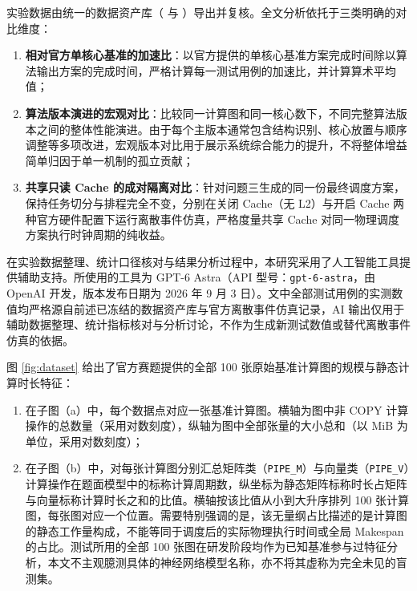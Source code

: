 \documentclass[anonymous,withtoc]{gmcm2026}
\providecommand{\tightlist}{\setlength{\itemsep}{0pt}\setlength{\parskip}{0pt}}
\begin{document}
实验数据由统一的数据资产库（\texttt{} 与 \texttt{}）导出并复核。全文分析依托于三类明确的对比维度：

\begin{enumerate}
\def\labelenumi{\arabic{enumi}.}
\tightlist
\item
  \textbf{相对官方单核心基准的加速比}：以官方提供的单核心基准方案完成时间除以算法输出方案的完成时间，严格计算每一测试用例的加速比，并计算算术平均值；
\item
  \textbf{算法版本演进的宏观对比}：比较同一计算图和同一核心数下，不同完整算法版本之间的整体性能演进。由于每个主版本通常包含结构识别、核心放置与顺序调整等多项改进，宏观版本对比用于展示系统综合能力的提升，不将整体增益简单归因于单一机制的孤立贡献；
\item
  \textbf{共享只读 Cache 的成对隔离对比}：针对问题三生成的同一份最终调度方案，保持任务切分与排程完全不变，分别在关闭 Cache（无 L2）与开启 Cache 两种官方硬件配置下运行离散事件仿真，严格度量共享 Cache 对同一物理调度方案执行时钟周期的纯收益。
\end{enumerate}

在实验数据整理、统计口径核对与结果分析过程中，本研究采用了人工智能工具提供辅助支持。所使用的工具为 GPT-6 Astra（API 型号：\texttt{gpt-6-astra}，由 OpenAI 开发，版本发布日期为 2026 年 9 月 3 日）。文中全部测试用例的实测数值均严格源自前述已冻结的数据资产库与官方离散事件仿真记录，AI 输出仅用于辅助数据整理、统计指标核对与分析讨论，不作为生成新测试数值或替代离散事件仿真的依据。

图 \ref{fig:dataset} 给出了官方赛题提供的全部 100 张原始基准计算图的规模与静态计算时长特征：

\begin{enumerate}
\def\labelenumi{\arabic{enumi}.}
\tightlist
\item
  在子图（a）中，每个数据点对应一张基准计算图。横轴为图中非 COPY 计算操作的总数量（采用对数刻度），纵轴为图中全部张量的大小总和（以 MiB 为单位，采用对数刻度）；
\item
  在子图（b）中，对每张计算图分别汇总矩阵类（\texttt{PIPE\_M}）与向量类（\texttt{PIPE\_V}）计算操作在题面模型中的标称计算周期数，纵坐标为静态矩阵标称时长占矩阵与向量标称计算时长之和的比值。横轴按该比值从小到大升序排列 100 张计算图，每张图对应一个位置。需要特别强调的是，该无量纲占比描述的是计算图的静态工作量构成，不能等同于调度后的实际物理执行时间或全局 Makespan 的占比。测试所用的全部 100 张图在研发阶段均作为已知基准参与过特征分析，本文不主观臆测具体的神经网络模型名称，亦不将其虚称为完全未见的盲测集。
\end{enumerate}
\end{document}
